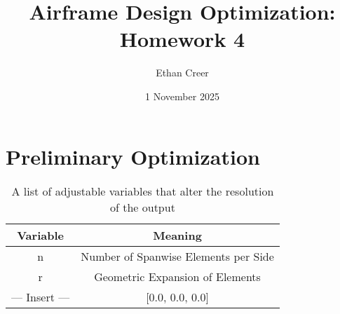 \documentclass{article}
\title{Airframe Design Optimization: Homework 4}
\author{Ethan Creer}
\date{1 November 2025}
\begin{document}
\maketitle
\section{Preliminary Optimization}



\begin{table}[H]
    \centering
    \caption{A list of adjustable variables that alter the resolution of the output}\label{tab:adjustables}
    \begin{tabular}{c c}
        \toprule
        \textbf{Variable} & \textbf{Meaning} \\
        \midrule
        n & Number of Spanwise Elements per Side \\
        r & Geometric Expansion of Elements \\
        --- Insert --- & [0.0, 0.0, 0.0] \\
        \bottomrule
    \end{tabular}
\end{table}
\end{document}
